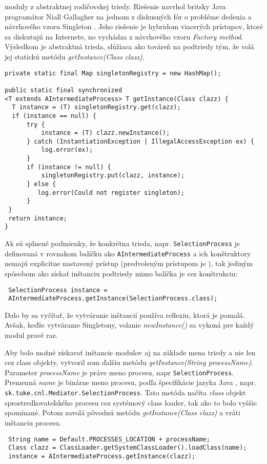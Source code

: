 moduly z abstraktnej rodičovskej triedy. Riešenie navrhol britsky Java programátor Niall Gallagher
na jednom z diskusných fór o probléme dedenia a návrhového vzoru Singleton \citep{gallagher}.
Jeho riešenie je hybridom viacerých prístupov, ktoré sa diskutujú na Internete, no vychádza z 
návrhového vzoru \emph{Factory method}. Výsledkom je abstraktná trieda, slúžiaca ako továreň na 
podtriedy tým, že volá jej statickú metódu \emph{getInstance(Class clazz)}. 
\begin{verbatim}
private static final Map singletonRegistry = new HashMap();

public static final synchronized 
<T extends AIntermediateProcess> T getInstance(Class clazz) {
  T instance = (T) singletonRegistry.get(clazz);
  if (instance == null) {
      try {
          instance = (T) clazz.newInstance();
      } catch (InstantiationException | IllegalAccessException ex) {
          log.error(ex);
      }
      if (instance != null) {
          singletonRegistry.put(clazz, instance);
      } else {
         log.error(Could not register singleton);
      }
 }
 return instance;
}
\end{verbatim}
Ak sú splnené podmienky, že konkrétna trieda, napr. \verb|SelectionProcess| je definovaná v rovnakom 
balíčku ako \verb|AIntermediateProcess| a ich konštruktory nemajú explicitne nastavený prístup 
(predvoleným prístupom je ), tak 
jediným spôsobom ako získať inštanciu podtriedy mimo balíčka je cez konštrukciu:
\begin{verbatim}
 SelectionProcess instance = 
 AIntermediateProcess.getInstance(SelectionProcess.class);
\end{verbatim}
Dalo by sa vyčítať, že vytváranie inštancií používa reflexiu, ktorá je pomalá. Avšak, keďže vytvárame 
Singletony, volanie \emph{newInstance()} sa vykoná pre každý modul pravé raz.

Aby bolo možné získavať inštancie modulov aj na základe mena triedy a nie len cez class objekty, vytvoril 
som ďalšiu metódu \emph{getInstance(String processName)}. Parameter \emph{processName} je práve meno 
procesu, napr \verb|SelectionProcess|. 
Premenná \emph{name} je binárne meno procesu, podľa špecifikácie jazyka Java \citep{java_spec},
napr. \verb|sk.tuke.cnl.Mediator.SelectionProcess|.
Tato metóda načíta \emph{class} objekt sprostredkovateľského procesu cez systémový class loader,
tak ako to bolo vyššie spomínané. Potom zavolá pôvodnú metódu \emph{getInstance(Class clazz)} a 
vráti inštanciu procesu.
\begin{verbatim}
 String name = Default.PROCESSES_LOCATION + processName;
 Class clazz = ClassLoader.getSystemClassLoader().loadClass(name);
 instance = AIntermediateProcess.getInstance(clazz);
\end{verbatim}



